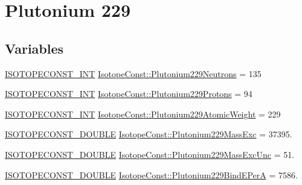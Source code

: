 \hypertarget{group___isotope_const-_plutonium-_pu229}{}\section{Plutonium 229}
\label{group___isotope_const-_plutonium-_pu229}
\subsection*{Variables}
\begin{DoxyCompactItemize}
\item 
\mbox{\hyperlink{group___isotope_const-_macros_ga5f18360b3e99483a35c32d789e62621c}{I\+S\+O\+T\+O\+P\+E\+C\+O\+N\+S\+T\+\_\+\+I\+NT}} \mbox{\hyperlink{group___isotope_const-_plutonium-_pu229_gabd7af0bb6e82bcd8b94ab3e3c53f9ede}{Isotope\+Const\+::\+Plutonium229\+Neutrons}} = 135
\item 
\mbox{\hyperlink{group___isotope_const-_macros_ga5f18360b3e99483a35c32d789e62621c}{I\+S\+O\+T\+O\+P\+E\+C\+O\+N\+S\+T\+\_\+\+I\+NT}} \mbox{\hyperlink{group___isotope_const-_plutonium-_pu229_gaa66d3d40e3fb1456d19cfd85df4cd3d7}{Isotope\+Const\+::\+Plutonium229\+Protons}} = 94
\item 
\mbox{\hyperlink{group___isotope_const-_macros_ga5f18360b3e99483a35c32d789e62621c}{I\+S\+O\+T\+O\+P\+E\+C\+O\+N\+S\+T\+\_\+\+I\+NT}} \mbox{\hyperlink{group___isotope_const-_plutonium-_pu229_ga2da4207bd366069a6272d691930b1a31}{Isotope\+Const\+::\+Plutonium229\+Atomic\+Weight}} = 229
\item 
\mbox{\hyperlink{group___isotope_const-_macros_ga8f45a7272ce02c0b4c65c44636ed719a}{I\+S\+O\+T\+O\+P\+E\+C\+O\+N\+S\+T\+\_\+\+D\+O\+U\+B\+LE}} \mbox{\hyperlink{group___isotope_const-_plutonium-_pu229_ga1e79eff8f6f987afc654c541a3240732}{Isotope\+Const\+::\+Plutonium229\+Mass\+Exc}} = 37395.
\item 
\mbox{\hyperlink{group___isotope_const-_macros_ga8f45a7272ce02c0b4c65c44636ed719a}{I\+S\+O\+T\+O\+P\+E\+C\+O\+N\+S\+T\+\_\+\+D\+O\+U\+B\+LE}} \mbox{\hyperlink{group___isotope_const-_plutonium-_pu229_ga1d9d57cf21f9aab3d7fa4d27a9cb4260}{Isotope\+Const\+::\+Plutonium229\+Mass\+Exc\+Unc}} = 51.
\item 
\mbox{\hyperlink{group___isotope_const-_macros_ga8f45a7272ce02c0b4c65c44636ed719a}{I\+S\+O\+T\+O\+P\+E\+C\+O\+N\+S\+T\+\_\+\+D\+O\+U\+B\+LE}} \mbox{\hyperlink{group___isotope_const-_plutonium-_pu229_ga67b659d2e56fc9f45c3a7e5820bef103}{Isotope\+Const\+::\+Plutonium229\+Bind\+E\+PerA}} = 7586.
\item 

\end{DoxyCompactItemize}
